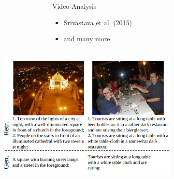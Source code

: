 \documentclass{beamer}
\begin{document}
\begin{frame}
\begin{figure}
\begin{minipage}[t][7cm][t]{\textwidth}
\begin{overprint}
\begin{columns}
\begin{column}{0.6\textwidth}
						\end{column}
						\begin{column}{0.4\textwidth}
							\begin{block}{Video Analysis
								}
								\begin{itemize}
									\item Srivastava et al. (2015) 
									\item and many more
								\end{itemize}
							\end{block}
						\end{column}
					\end{columns}
					\onslide<9>
					\begin{columns}
						\begin{column}{0.6\textwidth}
							\begin{figure}[ht]
								\centering
								\includegraphics[width=1\linewidth]{images/ic}
								\label{fig:ic}
								

\end{figure}
\end{column}
\end{columns}
\end{overprint}
\end{minipage}
\end{figure}
\end{frame}
\end{document}
